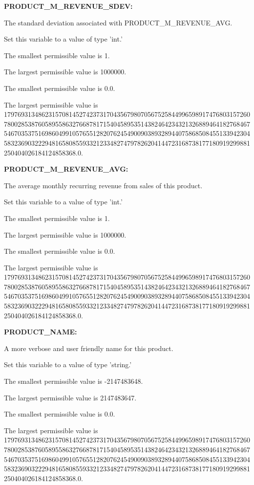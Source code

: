 \textbf{PRODUCT\_M\_REVENUE\_SDEV:}


The standard deviation associated with PRODUCT\_M\_REVENUE\_AVG.

Set this variable to a value of type 'int.'

The smallest permissible value is 1.

The largest permissible value is 1000000.

The smallest permissible value is 0.0.

The largest permissible value is 179769313486231570814527423731704356798070567525844996598917476803157260780028538760589558632766878171540458953514382464234321326889464182768467546703537516986049910576551282076245490090389328944075868508455133942304583236903222948165808559332123348274797826204144723168738177180919299881250404026184124858368.0.


\textbf{PRODUCT\_M\_REVENUE\_AVG:}


The average monthly recurring revenue from sales of this product.

Set this variable to a value of type 'int.'

The smallest permissible value is 1.

The largest permissible value is 1000000.

The smallest permissible value is 0.0.

The largest permissible value is 179769313486231570814527423731704356798070567525844996598917476803157260780028538760589558632766878171540458953514382464234321326889464182768467546703537516986049910576551282076245490090389328944075868508455133942304583236903222948165808559332123348274797826204144723168738177180919299881250404026184124858368.0.


\textbf{PRODUCT\_NAME:}


A more verbose and user friendly name for this product.

Set this variable to a value of type 'string.'

The smallest permissible value is -2147483648.

The largest permissible value is 2147483647.

The smallest permissible value is 0.0.

The largest permissible value is 179769313486231570814527423731704356798070567525844996598917476803157260780028538760589558632766878171540458953514382464234321326889464182768467546703537516986049910576551282076245490090389328944075868508455133942304583236903222948165808559332123348274797826204144723168738177180919299881250404026184124858368.0.


